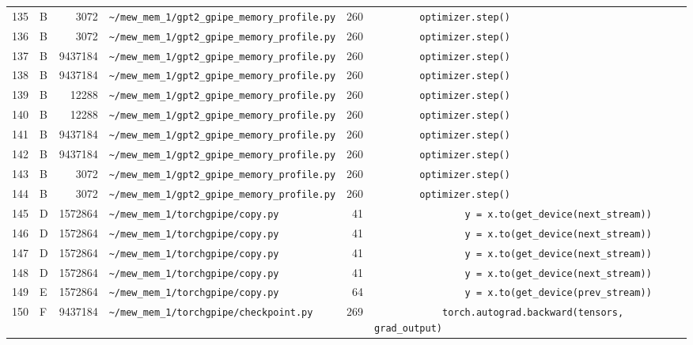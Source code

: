 \documentclass{article}
\begin{document}
\begin{longtable}{r l r p{6.5cm} r p{7.0cm}}
135 & B & 3072 & \lstinline|~/mew_mem_1/gpt2_gpipe_memory_profile.py| & 260 & \lstinline|        optimizer.step()| \\
136 & B & 3072 & \lstinline|~/mew_mem_1/gpt2_gpipe_memory_profile.py| & 260 & \lstinline|        optimizer.step()| \\
137 & B & 9437184 & \lstinline|~/mew_mem_1/gpt2_gpipe_memory_profile.py| & 260 & \lstinline|        optimizer.step()| \\
138 & B & 9437184 & \lstinline|~/mew_mem_1/gpt2_gpipe_memory_profile.py| & 260 & \lstinline|        optimizer.step()| \\
139 & B & 12288 & \lstinline|~/mew_mem_1/gpt2_gpipe_memory_profile.py| & 260 & \lstinline|        optimizer.step()| \\
140 & B & 12288 & \lstinline|~/mew_mem_1/gpt2_gpipe_memory_profile.py| & 260 & \lstinline|        optimizer.step()| \\
141 & B & 9437184 & \lstinline|~/mew_mem_1/gpt2_gpipe_memory_profile.py| & 260 & \lstinline|        optimizer.step()| \\
142 & B & 9437184 & \lstinline|~/mew_mem_1/gpt2_gpipe_memory_profile.py| & 260 & \lstinline|        optimizer.step()| \\
143 & B & 3072 & \lstinline|~/mew_mem_1/gpt2_gpipe_memory_profile.py| & 260 & \lstinline|        optimizer.step()| \\
144 & B & 3072 & \lstinline|~/mew_mem_1/gpt2_gpipe_memory_profile.py| & 260 & \lstinline|        optimizer.step()| \\
145 & D & 1572864 & \lstinline|~/mew_mem_1/torchgpipe/copy.py| & 41 & \lstinline|                y = x.to(get_device(next_stream))| \\
146 & D & 1572864 & \lstinline|~/mew_mem_1/torchgpipe/copy.py| & 41 & \lstinline|                y = x.to(get_device(next_stream))| \\
147 & D & 1572864 & \lstinline|~/mew_mem_1/torchgpipe/copy.py| & 41 & \lstinline|                y = x.to(get_device(next_stream))| \\
148 & D & 1572864 & \lstinline|~/mew_mem_1/torchgpipe/copy.py| & 41 & \lstinline|                y = x.to(get_device(next_stream))| \\
149 & E & 1572864 & \lstinline|~/mew_mem_1/torchgpipe/copy.py| & 64 & \lstinline|                y = x.to(get_device(prev_stream))| \\
150 & F & 9437184 & \lstinline|~/mew_mem_1/torchgpipe/checkpoint.py| & 269 & \lstinline|            torch.autograd.backward(tensors, grad_output)| \\

\end{longtable}
\end{document}
